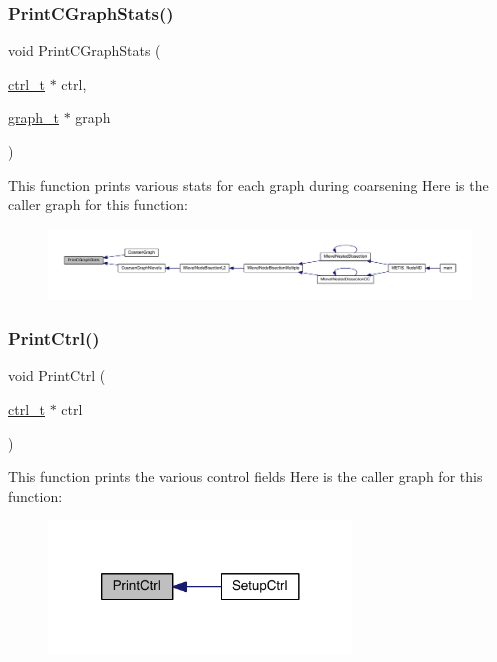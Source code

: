 \subsubsection{\texorpdfstring{Print\+C\+Graph\+Stats()}{PrintCGraphStats()}}
{\footnotesize\ttfamily void Print\+C\+Graph\+Stats (\begin{DoxyParamCaption}\item[{\hyperlink{a00742}{ctrl\+\_\+t} $\ast$}]{ctrl,  }\item[{\hyperlink{a00734}{graph\+\_\+t} $\ast$}]{graph }\end{DoxyParamCaption})}

This function prints various stats for each graph during coarsening Here is the caller graph for this function\+:\nopagebreak
\begin{figure}[H]
\begin{center}
\leavevmode
\includegraphics[width=350pt]{a00945_aac3e480e7e3bd02bfdf001d858a93562_icgraph}
\end{center}
\end{figure}
\mbox{\label{a00945_a2c75ede1a41b19cb3705b998aba3200b}} 
\subsubsection{\texorpdfstring{Print\+Ctrl()}{PrintCtrl()}}
{\footnotesize\ttfamily void Print\+Ctrl (\begin{DoxyParamCaption}\item[{\hyperlink{a00742}{ctrl\+\_\+t} $\ast$}]{ctrl }\end{DoxyParamCaption})}

This function prints the various control fields Here is the caller graph for this function\+:\nopagebreak
\begin{figure}[H]
\begin{center}
\leavevmode
\includegraphics[width=228pt]{a00945_a2c75ede1a41b19cb3705b998aba3200b_icgraph}
\end{center}
\end{figure}
\mbox{\label{a00945_a9723ce68d6093abc3aca1086e672cde9}} 
